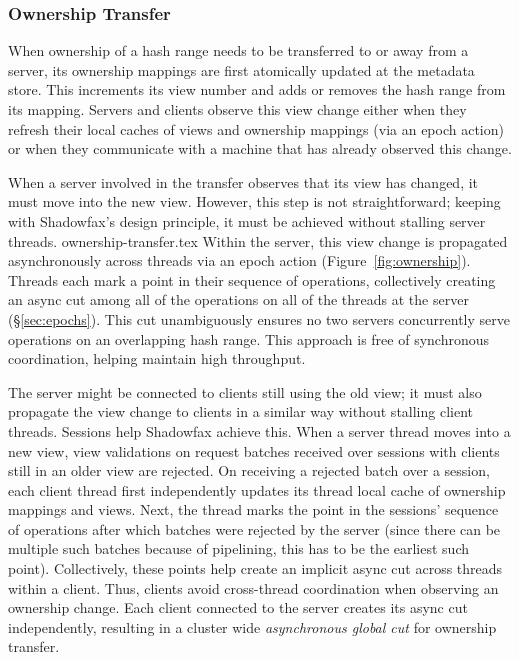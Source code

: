\subsubsection{Ownership Transfer}
\label{design:ownership-tx}

When ownership of a hash range needs to be transferred to or away from a
server, its ownership mappings are first atomically updated at the
metadata store.
%
This increments its view number and adds or removes the hash range from
its mapping.
%
Servers and clients observe this view change either when they refresh
their local caches of views and ownership mappings (via an epoch action) or
when they communicate with a machine that has already observed this change.

When a server involved in the transfer observes that its view has
changed, it must move into the new view.
%
However, this step is not straightforward; keeping with
Shadowfax's design principle, it must be achieved without stalling
server threads.
%
 {ownership-transfer.tex}
%
%
Within the server, this view change is propagated asynchronously across
threads via an epoch action (Figure~\ref{fig:ownership}).
%
Threads each mark a point in their sequence of operations, collectively creating
an async cut among all of the operations on all of the threads at the server
(\S\ref{sec:epochs}).
%
This cut unambiguously ensures no two servers concurrently
serve operations on an overlapping hash range.
%
This approach is free of synchronous coordination, helping maintain high
throughput.

The server might be connected to clients still using the old view; it must also
propagate the view change to clients in a similar way without stalling client
threads.
%
Sessions help Shadowfax achieve this.
%
%
When a server thread moves into a new view, view validations on request
batches received over sessions with clients still in an older view
are rejected.
%
%
%
On receiving a rejected batch over a session, each client thread first
independently updates its thread local cache of ownership mappings and
views.
%
Next, the thread marks the point in the sessions' sequence of
operations after which batches were rejected by the server (since there
can be multiple such batches because of pipelining, this has to be
the earliest such point).
%
Collectively, these points help create an implicit async cut across
threads within a
client.
%
Thus, clients avoid cross-thread
coordination when observing an ownership change.
%
Each client connected to the server creates its async cut independently,
resulting in a cluster wide \emph{asynchronous global cut} for ownership
transfer.

